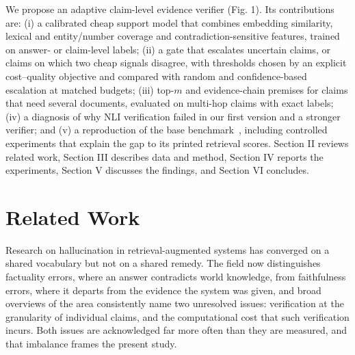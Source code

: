 \documentclass[conference]{IEEEtran}
\begin{document}
We propose an adaptive claim-level evidence verifier (Fig. 1). Its contributions are: (i) a calibrated cheap support model that combines embedding similarity, lexical and entity/number coverage and contradiction-sensitive features, trained on answer- or claim-level labels; (ii) a gate that escalates uncertain claims, or claims on which two cheap signals disagree, with thresholds chosen by an explicit cost--quality objective and compared with random and confidence-based escalation at matched budgets; (iii) top-$m$ and evidence-chain premises for claims that need several documents, evaluated on multi-hop claims with exact labels; (iv) a diagnosis of why NLI verification failed in our first version and a stronger verifier; and (v) a reproduction of the base benchmark~\cite{mala_ml}, including controlled experiments that explain the gap to its printed retrieval scores. Section II reviews related work, Section III describes data and method, Section IV reports the experiments, Section V discusses the findings, and Section VI concludes.

\section{Related Work}

Research on hallucination in retrieval-augmented systems has converged on a shared vocabulary but not on a shared remedy. The field now distinguishes factuality errors, where an answer contradicts world knowledge, from faithfulness errors, where it departs from the evidence the system was given, and broad overviews of the area consistently name two unresolved issues: verification at the granularity of individual claims, and the computational cost that such verification incurs. Both issues are acknowledged far more often than they are measured, and that imbalance frames the present study.
\end{document}
